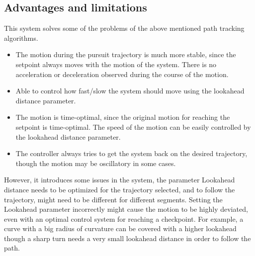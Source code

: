 \documentclass[hidelinks,BTech]{iitmdiss}
\begin{document}
\subsection*{Advantages and limitations}
This system solves some of the problems of the above mentioned path tracking algorithms.
\begin{itemize}
	\item The motion during the pursuit trajectory is much more stable, since the setpoint always moves with the motion of the system. There is no acceleration or deceleration observed during the course of the motion.
	\item Able to control how fast/slow the system should move using the lookahead distance parameter. 
	\item The motion is time-optimal, since the original motion for reaching the setpoint is time-optimal. The speed of the motion can be easily controlled by the lookahead distance parameter.
	\item The controller always tries to get the system back on the desired trajectory, though the motion may be oscillatory in some cases. 
\end{itemize}


However, it introduces some issues in the system, the parameter Lookahead distance needs to be optimized for the trajectory selected, and to follow the trajectory, might need to be different for different segments. Setting the Lookahead parameter incorrectly might cause the motion to be highly deviated, even with an optimal control system for reaching a checkpoint. 
For example, a curve with a big radius of curvature can be covered with a higher lookahead though a sharp turn needs a very small lookahead distance in order to follow the path.
\end{document}
